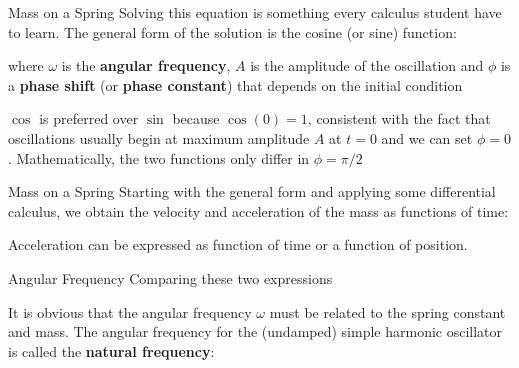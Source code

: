 \documentclass[12pt,compress,aspectratio=169]{beamer}
\newcommand{\eq}[2]{\vspace{#1}{\Large\begin{displaymath}#2\end{displaymath}}}
\begin{document}
\begin{frame}{Mass on a Spring}
  Solving this equation is something  every calculus student have to learn. The
  general form of the solution is the cosine (or sine) function:

  \eq{-.25in}{
    x(t)=A\cos(\omega t-\phi)
  }

  \vspace{-.1in}where $\omega$ is the \textbf{angular frequency}, $A$ is the
  amplitude of the oscillation and $\phi$ is a \textbf{phase shift} (or
  \textbf{phase constant}) that depends on the initial condition
  
  \vspace{.15in}$\cos$ is preferred over $\sin$ because $\cos(0)=1$,
  consistent with the fact that oscillations usually begin at maximum amplitude
  $A$ at $t=0$ and we can set $\phi=0$. Mathematically, the two functions only
  differ in $\phi=\pi/2$
\end{frame}


\begin{frame}{Mass on a Spring}
  Starting with the general form and applying some differential calculus, we
  obtain the velocity and acceleration of the mass as functions of time:
 
  \vspace{-.35in}{\Large
    \begin{align*}
      x(t)&=A\cos(\omega t-\phi)\\
      v(t)&=-A\omega\sin(\omega t-\phi)\\
      a(t)&=-A\omega^2\cos(\omega t-\phi)=-\omega^2x
    \end{align*}
  }

  Acceleration can be expressed as function of time or a function of position.
\end{frame}



\begin{frame}{Angular Frequency}
  Comparing these two expressions

  \eq{-.2in}{
    a(t)=-\omega^2x(t)\quad\quad -kx(t)=ma(t)
  }
  
  It is obvious that the angular frequency $\omega$ must be related to the
  spring constant and mass. The angular frequency for the (undamped) simple
  harmonic oscillator is called the \textbf{natural frequency}:

  \eq{-.15in}{
    \boxed{\omega=\sqrt{\frac{k}{m}}}
  }
\end{frame}
\end{document}
